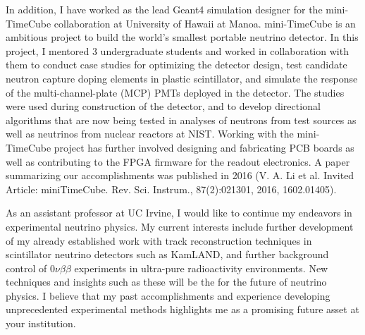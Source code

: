 \documentclass[10pt]{article} %
\begin{document}
In addition, I have worked as the lead Geant4 simulation designer for the
mini-TimeCube collaboration at University of Hawaii at Manoa. mini-TimeCube is
an ambitious project to build the world's smallest portable neutrino detector.
In this project, I mentored 3 undergraduate students and worked in
collaboration with them to conduct case studies for optimizing the detector
design, test candidate neutron capture doping elements in plastic scintillator,
and simulate the response of the multi-channel-plate (MCP) PMTs deployed in the
detector. The studies were used during construction of the detector, and to
develop directional algorithms that are now being tested in analyses of
neutrons from test sources as well as neutrinos from nuclear reactors at NIST.
Working with the mini-TimeCube project has further involved designing and
fabricating PCB boards as well as contributing to the FPGA firmware for the
readout electronics. A paper summarizing our accomplishments was published in
2016 (V. A. Li et al. Invited Article: miniTimeCube. Rev. Sci. Instrum.,
87(2):021301, 2016, 1602.01405).


As an assistant professor at UC Irvine, I would like to continue my endeavors
in experimental neutrino physics. My current interests include further
development of my already established work with track reconstruction techniques
in scintillator neutrino detectors such as KamLAND, and further background
control of $0\nu\beta\beta$ experiments in ultra-pure radioactivity
environments. New techniques and insights such as these will be the for the
future of neutrino physics. I believe that my past accomplishments and
experience developing unprecedented experimental methods highlights me as a
promising future asset at your institution. 
\end{document}
